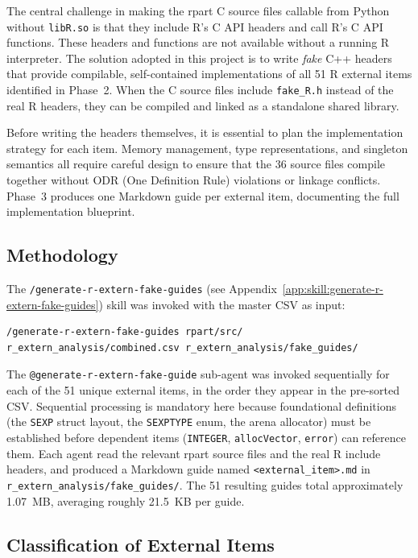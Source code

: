 \documentclass[12pt]{article}
\newcommand{\skillapp}[2]{\texttt{/#1} (see Appendix~\ref{app:skill:#2})}
\begin{document}
The central challenge in making the rpart C source files callable from Python without \texttt{libR.so} is that they include R's C API headers and call R's C API functions. These headers and functions are not available without a running R interpreter. The solution adopted in this project is to write \emph{fake} C++ headers that provide compilable, self-contained implementations of all 51 R external items identified in Phase~2. When the C source files include \texttt{fake\_R.h} instead of the real R headers, they can be compiled and linked as a standalone shared library.

Before writing the headers themselves, it is essential to plan the implementation strategy for each item. Memory management, type representations, and singleton semantics all require careful design to ensure that the 36 source files compile together without ODR (One Definition Rule) violations or linkage conflicts. Phase~3 produces one Markdown guide per external item, documenting the full implementation blueprint.

\subsection{Methodology}

The \skillapp{generate-r-extern-fake-guides}{generate-r-extern-fake-guides} skill was invoked with the master CSV as input:
\begin{lstlisting}[style=skill]
/generate-r-extern-fake-guides rpart/src/ r_extern_analysis/combined.csv r_extern_analysis/fake_guides/
\end{lstlisting}

The \texttt{@generate-r-extern-fake-guide} sub-agent was invoked sequentially for each of the 51 unique external items, in the order they appear in the pre-sorted CSV. Sequential processing is mandatory here because foundational definitions (the \texttt{SEXP} struct layout, the \texttt{SEXPTYPE} enum, the arena allocator) must be established before dependent items (\texttt{INTEGER}, \texttt{allocVector}, \texttt{error}) can reference them. Each agent read the relevant rpart source files and the real R include headers, and produced a Markdown guide named \texttt{<external\_item>.md} in \texttt{r\_extern\_analysis/fake\_guides/}. The 51 resulting guides total approximately 1.07~MB, averaging roughly 21.5~KB per guide.

\subsection{Classification of External Items}
\end{document}
